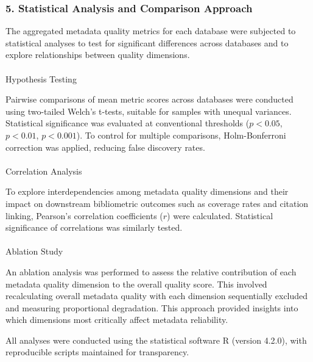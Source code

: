 \documentclass[
  12pt,
]{article}
\makeatletter
\let\oldparagraph\paragraph
\renewcommand{\paragraph}{
    \@ifstar
      \xxxParagraphStar
      \xxxParagraphNoStar
  }
\newcommand{\xxxParagraphStar}[1]{\oldparagraph*{#1}\mbox{}}
\newcommand{\xxxParagraphNoStar}[1]{\oldparagraph{#1}\mbox{}}
\makeatother
\begin{document}
\subsubsection{5. Statistical Analysis and Comparison
Approach}\label{statistical-analysis-and-comparison-approach}

The aggregated metadata quality metrics for each database were subjected
to statistical analyses to test for significant differences across
databases and to explore relationships between quality dimensions.

\paragraph{Hypothesis Testing}\label{hypothesis-testing}

Pairwise comparisons of mean metric scores across databases were
conducted using two-tailed Welch's t-tests, suitable for samples with
unequal variances. Statistical significance was evaluated at
conventional thresholds (\(p < 0.05\), \(p < 0.01\), \(p < 0.001\)). To
control for multiple comparisons, Holm-Bonferroni correction was
applied, reducing false discovery rates.

\paragraph{Correlation Analysis}\label{correlation-analysis}

To explore interdependencies among metadata quality dimensions and their
impact on downstream bibliometric outcomes such as coverage rates and
citation linking, Pearson's correlation coefficients (\(r\)) were
calculated. Statistical significance of correlations was similarly
tested.

\paragraph{Ablation Study}\label{ablation-study}

An ablation analysis was performed to assess the relative contribution
of each metadata quality dimension to the overall quality score. This
involved recalculating overall metadata quality with each dimension
sequentially excluded and measuring proportional degradation. This
approach provided insights into which dimensions most critically affect
metadata reliability.

All analyses were conducted using the statistical software R (version
4.2.0), with reproducible scripts maintained for transparency.
\end{document}
